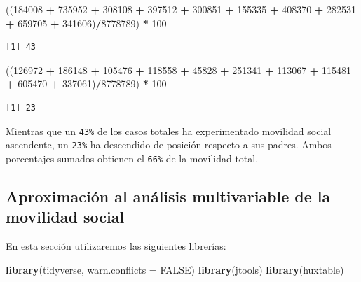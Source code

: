 \documentclass[
]{article}
\newenvironment{Shaded}{\begin{snugshade}}{\end{snugshade}}
\newcommand{\AttributeTok}[1]{\textcolor[rgb]{0.13,0.29,0.53}{#1}}
\newcommand{\ConstantTok}[1]{\textcolor[rgb]{0.56,0.35,0.01}{#1}}
\newcommand{\DecValTok}[1]{\textcolor[rgb]{0.00,0.00,0.81}{#1}}
\newcommand{\FunctionTok}[1]{\textcolor[rgb]{0.13,0.29,0.53}{\textbf{#1}}}
\newcommand{\NormalTok}[1]{#1}
\newcommand{\SpecialCharTok}[1]{\textcolor[rgb]{0.81,0.36,0.00}{\textbf{#1}}}
\begin{document}
\begin{Shaded}
\begin{Highlighting}[]
\NormalTok{((}\DecValTok{184008} \SpecialCharTok{+} \DecValTok{735952} \SpecialCharTok{+} \DecValTok{308108} \SpecialCharTok{+} \DecValTok{397512} \SpecialCharTok{+} \DecValTok{300851} \SpecialCharTok{+} \DecValTok{155335} \SpecialCharTok{+} \DecValTok{408370} \SpecialCharTok{+} \DecValTok{282531} \SpecialCharTok{+} \DecValTok{659705} \SpecialCharTok{+}
    \DecValTok{341606}\NormalTok{)}\SpecialCharTok{/}\DecValTok{8778789}\NormalTok{) }\SpecialCharTok{*} \DecValTok{100}
\end{Highlighting}
\end{Shaded}

\begin{verbatim}
[1] 43
\end{verbatim}

\begin{Shaded}
\begin{Highlighting}[]
\NormalTok{((}\DecValTok{126972} \SpecialCharTok{+} \DecValTok{186148} \SpecialCharTok{+} \DecValTok{105476} \SpecialCharTok{+} \DecValTok{118558} \SpecialCharTok{+} \DecValTok{45828} \SpecialCharTok{+} \DecValTok{251341} \SpecialCharTok{+} \DecValTok{113067} \SpecialCharTok{+} \DecValTok{115481} \SpecialCharTok{+} \DecValTok{605470} \SpecialCharTok{+}
    \DecValTok{337061}\NormalTok{)}\SpecialCharTok{/}\DecValTok{8778789}\NormalTok{) }\SpecialCharTok{*} \DecValTok{100}
\end{Highlighting}
\end{Shaded}

\begin{verbatim}
[1] 23
\end{verbatim}

Mientras que un \texttt{43\%} de los casos totales ha experimentado movilidad social ascendente, un \texttt{23\%} ha descendido de posición respecto a sus padres. Ambos porcentajes sumados obtienen el \texttt{66\%} de la movilidad total.

\hypertarget{movilidad3}{%
\subsection{Aproximación al análisis multivariable de la movilidad social}\label{movilidad3}}

En esta sección utilizaremos las siguientes librerías:

\begin{Shaded}
\begin{Highlighting}[]
\FunctionTok{library}\NormalTok{(tidyverse, }\AttributeTok{warn.conflicts =} \ConstantTok{FALSE}\NormalTok{)}
\FunctionTok{library}\NormalTok{(jtools)}
\FunctionTok{library}\NormalTok{(huxtable)}
\end{Highlighting}
\end{Shaded}
\end{document}
